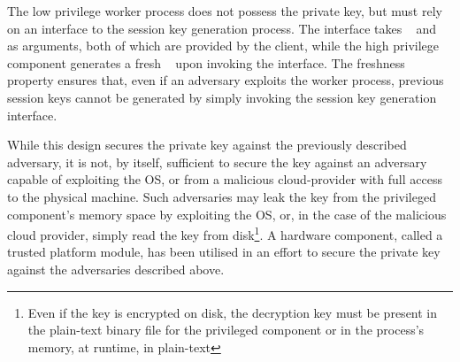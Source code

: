 \documentclass[../main.tex]{subfiles}
\begin{document}
The low privilege worker process does not possess the private
key, but must rely on an interface to the session key generation
process. The interface takes \crandom~ and \premaster~ as arguments,
both of which are provided by the client, while the high privilege
component generates a fresh \srandom~ upon invoking the interface. The
freshness property ensures that, even if an adversary exploits the
worker process, previous session keys cannot be generated by simply
invoking the session key generation interface.

While this design secures the private key against the previously
described adversary, it is not, by itself, sufficient to secure the
key against an adversary capable of exploiting the OS, or from a
malicious cloud-provider with full access to the physical
machine. Such adversaries may leak the key from the privileged
component's memory space by exploiting the OS, or, in the case of the
malicious cloud provider, simply read the key from disk\footnote{Even
  if the key is encrypted on disk, the decryption key must be present
  in the plain-text binary file for the privileged component or in the
  process's memory, at runtime, in plain-text}.  A hardware component,
called a trusted platform module, has been utilised in an effort to
secure the private key against the adversaries described above.
\end{document}
